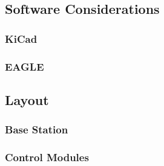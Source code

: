 
\subsection{Software Considerations}

\subsubsection{KiCad}

\subsubsection{EAGLE}

\subsection{Layout}

\subsubsection{Base Station}

\subsubsection{Control Modules}

